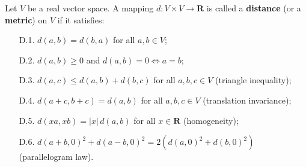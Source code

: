 Let $V$ be a real vector space. A mapping $d: V \times V \to \mathbf{R}$ is called a \textbf{distance} (or a \textbf{metric}) on $V$ if it satisfies:
\begin{itemize}
\item[D.1.] $d(a, b) = d(b, a)$ for all $a, b \in V$;
\item[D.2.] $d(a, b) \geq 0$ and $d(a, b) = 0 \iff a = b$;
\item[D.3.] $d(a, c) \leq d(a, b) + d(b, c)$ for all $a, b, c \in V$ (triangle inequality);
\item[D.4.] $d(a + c, b + c) = d(a, b)$ for all $a, b, c \in V$ (translation invariance);
\item[D.5.] $d(xa, xb) = |x|\, d(a, b)$ for all $x \in \mathbf{R}$ (homogeneity);
\item[D.6.] $d(a + b, 0)^2 + d(a - b, 0)^2 = 2(d(a, 0)^2 + d(b, 0)^2)$ (parallelogram law).
\end{itemize}
